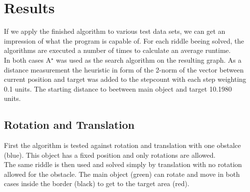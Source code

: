 \chapter{Results}
If we apply the finished algorithm to various test data sets, we can get an impression of what the program is capable of.
For each riddle beeing solved, the algorithms are executed a number of times to calculate an average runtime.\\
In both cases A$^\star$ was used as the search algorithm on the resulting graph. As a distance measurement the heuristic in form of the 2-norm of the vector between current position and target was added to the stepcount with each step weighting 0.1 units. The starting distance to beetween main object and target 10.1980 units.
\section{Rotation and Translation}
First the algorithm is tested against rotation and translation with one obstalce (blue). This object has a fixed position and only rotations are allowed.\\
The same riddle is then used and solved simply by translation with no rotation allowed for the obstacle. The main object (green) can rotate and move in both cases inside the border (black) to get to the target area (red).

